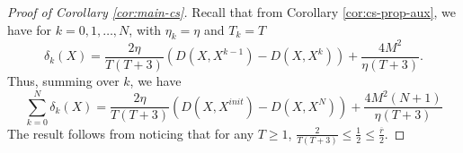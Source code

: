 \documentclass[10pt]{article}
\begin{document}
\begin{proof}[Proof of Corollary \ref{cor:main-cs}]
Recall that from Corollary \ref{cor:cs-prop-aux}, we have for $k=0,1,\ldots,N$, with $\eta_k=\eta$ and $T_k = T$
\begin{equation*}
    \delta_k(X) = \frac{2\eta}{T(T+3)}\left(D(X,X^{k-1})  
     - D(X,X^k)\right) + \frac{4M^2}{\eta(T+3)}.
\end{equation*}
Thus, summing over $k$, we have 
\begin{equation*}
     \sum_{k=0}^N\delta_k(X)=  \frac{2\eta}{T(T+3)}\left(D(X,X^{init})  
     - D(X,X^N)\right) + \frac{4M^2(N+1)}{\eta(T+3)}
\end{equation*}
The result follows from noticing that for any $T\geq 1$, $\frac{2}{T(T+3)}\leq \frac{1}{2} \leq \frac{\overline{r}}{2}$. 


\end{proof}
\end{document}
